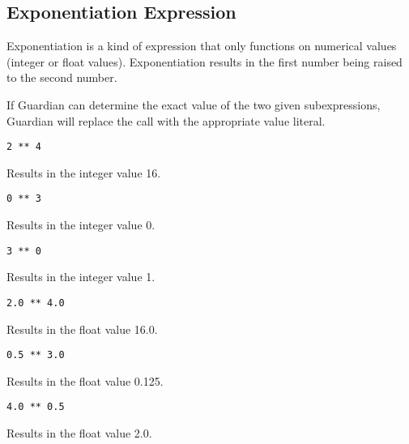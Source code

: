 
\subsection{Exponentiation Expression}
{
	Exponentiation is a kind of expression that only functions on
	numerical values (integer or float values).
	Exponentiation results in the first number being raised to the
	second number.
	
	If Guardian can determine the exact value of the two given subexpressions,
	Guardian will replace the call with the appropriate value literal.
	
	\begin{itemize}
	{
		\item[] \texttt{2 ** 4}
		
			Results in the integer value 16.
		
		\item[] \texttt{0 ** 3}
		
			Results in the integer value 0.
		
		\item[] \texttt{3 ** 0}
		
			Results in the integer value 1.
		
		\item[] \texttt{2.0 ** 4.0}
		
			Results in the float value 16.0.
		
		\item[] \texttt{0.5 ** 3.0}
		
			Results in the float value 0.125.
		
		\item[] \texttt{4.0 ** 0.5}
		
			Results in the float value 2.0.
	}
	\end{itemize}
}
